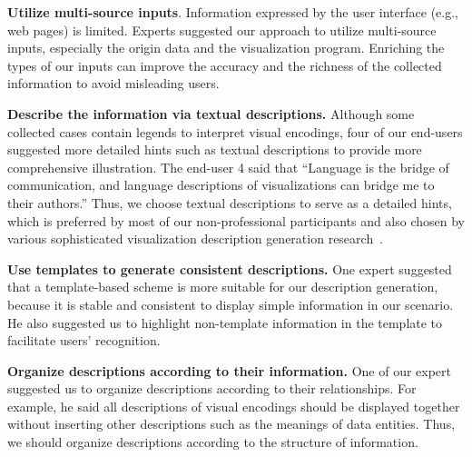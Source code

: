 \begin{compactenum}[\textbf{E}1]
    \item {\bf Utilize multi-source inputs}. 
    Information expressed by the user interface (e.g., web pages) is limited.
    Experts suggested our approach to utilize multi-source inputs, especially the origin data and the visualization program.
    Enriching the types of our inputs can improve the accuracy and the richness of the collected information to avoid misleading users.
\end{compactenum}

\begin{compactenum}[\textbf{D}1]
    \item {\bf Describe the information via textual descriptions.} 
    Although some collected cases contain legends to interpret visual encodings, four of our end-users suggested more detailed hints such as textual descriptions to provide more comprehensive illustration. The end-user 4 said that ``Language is the bridge of communication, and language descriptions of visualizations can bridge me to their authors.'' 
    Thus, we choose textual descriptions to serve as a detailed hints, which is preferred by most of our non-professional participants and also chosen by various sophisticated visualization description generation research~\cite{DBLP:journals/tochi/FerresLST13, DBLP:conf/inlg/ObeidH20, DBLP:conf/apvis/LiuXHWY20}.
    
    \item {\bf Use templates to generate consistent descriptions.}
    One expert suggested that a template-based scheme is more suitable for our description generation, because it is stable and consistent to display simple information in our scenario. He also suggested us to highlight non-template information in the template to facilitate users' recognition.
    
    \item {\bf Organize descriptions according to their information.}
    One of our expert suggested us to organize descriptions according to their relationships. For example, he said all descriptions of visual encodings should be displayed together without inserting other descriptions such as the meanings of data entities.
    Thus, we should organize descriptions according to the structure of information.


\end{compactenum}
